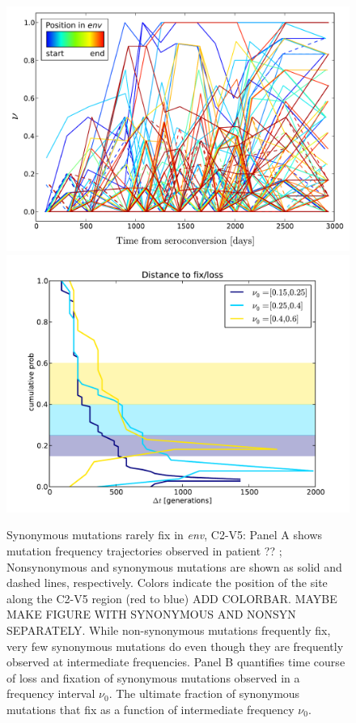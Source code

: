 \documentclass[rmp, twocolumn]{revtex4}
\newcommand{\env}{\textit{env}}
\begin{document}
\begin{figure}
\begin{center}
\includegraphics[width=\linewidth]{Shankarappa_allele_freqs_trajectories_syn_nonsynp8}
\includegraphics[width=\linewidth]{Shankarappa_fix_loss_dt_times}
\caption{Synonymous mutations rarely fix in \env, C2-V5: Panel A shows mutation 
frequency trajectories observed in patient ?? \cite{shankarappa_consistent_1999};  Nonsynonymous
and synonymous mutations are shown as solid and dashed lines, respectively. 
Colors indicate the position of the site along the C2-V5 region (red to blue) ADD COLORBAR. MAYBE MAKE FIGURE WITH SYNONYMOUS AND NONSYN SEPARATELY.
While non-synonymous mutations frequently fix, very few synonymous mutations do even though they are frequently observed at intermediate frequencies. Panel B quantifies time course of loss and fixation of synonymous mutations observed in a frequency interval $\nu_0$. The ultimate fraction of synonymous mutations that fix as a function of intermediate frequency $\nu_0$.
}
\label{fig:aft}
\end{center}
\end{figure}
\end{document}
